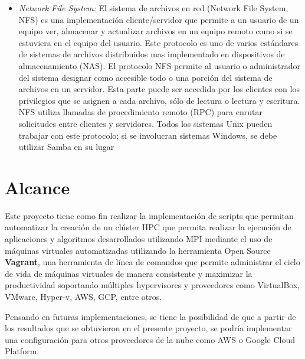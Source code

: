 \documentclass[letterpaper, 12pt, oneside]{article}
\begin{document}
\begin{itemize}
        
        \item \textit{Network File System:} 
        El sistema de archivos en red (Network File System, NFS) es una implementación cliente/servidor que permite a un usuario de un equipo ver, almacenar y actualizar archivos en un equipo remoto como si se estuviera en el equipo del usuario. Este protocolo es uno de varios estándares de sistemas de archivos distribuidos mas implementado en dispositivos de almacenamiento (NAS).
        El protocolo NFS permite al usuario o administrador del sistema designar como accesible todo o una porción del sistema de archivos en un servidor. Esta parte puede ser accedida por los clientes con los privilegios que se asignen a cada archivo, sólo de lectura o lectura y escritura. NFS utiliza llamadas de procedimiento remoto (RPC) para enrutar solicitudes entre clientes y servidores\cite{NFS}.
        Todos los sistemas Unix pueden trabajar con este protocolo; si se involucran sistemas Windows, se debe utilizar Samba en su lugar\cite{NFS2} 
    \end{itemize}
  

    \section{Alcance}
    
    Este proyecto tiene como fin realizar la implementación de scripts que permitan automatizar la creación de un clúster HPC que permita realizar la ejecución de aplicaciones y algoritmos desarrollados utilizando MPI mediante el uso de máquinas virtuales automatizadas utilizando la herramienta Open Source \textbf{Vagrant},  una herramienta de línea de comandos  que permite administrar el ciclo de vida de máquinas virtuales de manera consistente y maximizar la productividad soportando múltiples hypervisores y proveedores como VirtualBox, VMware, Hyper-v, AWS, GCP, entre otros.
    
    Pensando en futuras implementaciones, se tiene la posibilidad de que a partir de los resultados que se obtuvieron en el presente proyecto, se podría implementar una configuración para otros proveedores de la nube como AWS o Google Cloud Platform. 
\end{document}
